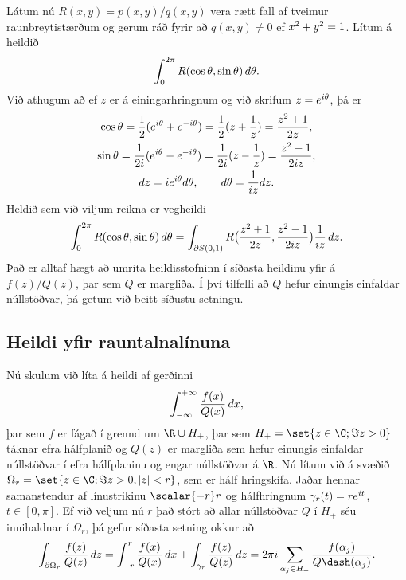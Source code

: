 Látum nú $R(x,y)=p(x,y)/q(x,y)$ vera rætt fall af tveimur
raunbreytistærð\-um og gerum ráð fyrir að $q(x,y)\neq 0$ ef $x\sp
2+y\sp 2=1$.  Lítum á heildið 
 \begin{equation*}\int_0\sp{2\pi} R(\cos\theta,\sin \theta) \, d\theta.\label{10.2.11}
 \end{equation*}
Við athugum að ef $z$  er á einingarhringnum og við skrifum
$z=e\sp{i\theta}$, þá er 
\begin{gather*}
\cos\theta=\dfrac 12(e\sp{i\theta}+e\sp{-i\theta})
=\dfrac12(z+\dfrac 1z)=\dfrac{z\sp 2+1}{2z},\label{10.2.12}\\ 
\sin\theta=\dfrac 1{2i}(e\sp{i\theta}-e\sp{-i\theta})
=\dfrac1{2i}(z-\dfrac 1z)=\dfrac{z\sp 2-1}{2iz},\label{10.2.13}\\ 
dz=ie\sp{i\theta}d\theta, \qquad d\theta=\dfrac 1{iz}dz.\label{10.2.14}
\end{gather*}
Heldið sem við viljum reikna er vegheildi
$$
\int_0\sp {2\pi}R(\cos\theta,\sin
\theta)\, d\theta =
\int_{\partial S(0,1)}R\big(\dfrac{z\sp 2+1}{2z},\dfrac{z\sp 2-1}{2iz}\big)
\dfrac 1{iz}\, dz.
$$
Það er alltaf hægt að umrita heildisstofninn í síðasta heildinu yfir
á $f(z)/Q(z)$, þar sem $Q$ er margliða. Í því tilfelli að $Q$ hefur 
einungis einfaldar núllstöðvar, þá getum við beitt síðustu  setningu.


\subsection*{Heildi yfir rauntalnalínuna}


Nú skulum við líta á heildi af gerðinni 
 $$\int_{-\infty}\sp{+\infty}\dfrac{f(x)}{Q(x)}\, dx,
 $$
þar sem $f$ er fágað í grennd um $\R\cup H_+$, þar sem $H_+=\set{z\in
\C; \Im z>0}$ táknar efra hálfplanið og $Q(z)$ er margliða sem hefur
einungis einfaldar núllstöðvar í efra hálfplaninu og engar
núllstöðvar á $\R$.  Nú lítum við á svæðið
$\Omega_r=\set{z\in \C; \Im z>0, |z|<r}$, sem er hálf hringskífa.
Jaðar hennar samanstendur af línustrikinu $\scalar {-r}r$ og
hálfhringnum $\gamma_r(t)=re\sp{it}$, $t\in [0,\pi]$. Ef við veljum nú
$r$ það stórt að allar núllstöðvar $Q$ í $H_+$ séu 
innihaldnar í $\Omega_r$, þá gefur
síðasta setning okkur að 
 $$
\int_{\partial\Omega_r} \dfrac {f(z)}{Q(z)}\, dz
=\int_{-r}\sp r \dfrac {f(x)}{Q(x)}\, dx +
\int_{\gamma_r}\dfrac{f(z)}{Q(z)}\, dz = 
2\pi i\sum_{\alpha_j\in H_+} \dfrac{f(\alpha_j)}{Q\dash(\alpha_j)}.
 $$


